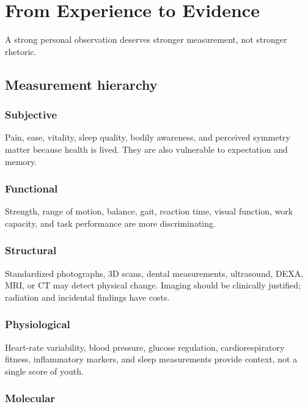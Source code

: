 \chapter{From Experience to Evidence}

A strong personal observation deserves stronger measurement, not stronger rhetoric.

\section{Measurement hierarchy}

\subsection{Subjective}

Pain, ease, vitality, sleep quality, bodily awareness, and perceived symmetry matter because health is lived. They are also vulnerable to expectation and memory.

\subsection{Functional}

Strength, range of motion, balance, gait, reaction time, visual function, work capacity, and task performance are more discriminating.

\subsection{Structural}

Standardized photographs, 3D scans, dental measurements, ultrasound, DEXA, MRI, or CT may detect physical change. Imaging should be clinically justified; radiation and incidental findings have costs.

\subsection{Physiological}

Heart-rate variability, blood pressure, glucose regulation, cardiorespiratory fitness, inflammatory markers, and sleep measurements provide context, not a single score of youth.

\subsection{Molecular}

